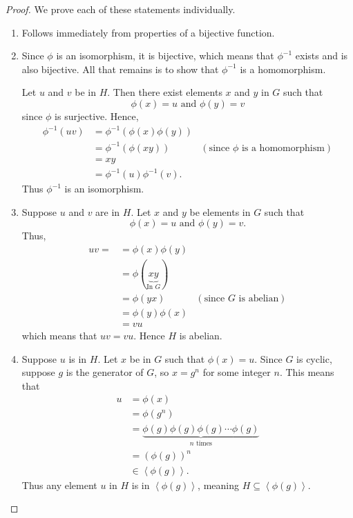 \begin{proof}
    We prove each of these statements individually.
    \begin{enumerate}
        \item Follows immediately from properties of a bijective function.

        \item Since $\phi$ is an isomorphism, it is bijective, which means that $\phi^{-1}$ exists and is also bijective. All that remains is to show that $\phi^{-1}$ is a homomorphism.

        Let $u$ and $v$ be in $H$. Then there exist elements $x$ and $y$ in $G$ such that
        \[
            \phi(x) = u \text{ and } \phi(y) = v
        \]
        since $\phi$ is surjective. Hence,
        \begin{align*}
            \phi^{-1}(uv) &= \phi^{-1}\left(\phi(x)\phi(y)\right)\\
            &= \phi^{-1}\left(\phi(xy)\right) & (\text{since } \phi \text{ is a homomorphism})\\
            &= xy\\
            &= \phi^{-1}(u) \phi^{-1}(v).
        \end{align*}
        Thus $\phi^{-1}$ is an isomorphism.

        \item Suppose $u$ and $v$ are in $H$. Let $x$ and $y$ be elements in $G$ such that
        \[
            \phi(x) = u \text{ and } \phi(y) = v.
        \]
        Thus,
        \begin{align*}
            uv = &= \phi(x)\phi(y) \\
            &= \phi(\underbrace{xy}_{\text{In } G})\\
            &= \phi(yx) & (\text{since } G \text{ is abelian})\\
            &= \phi(y)\phi(x)\\
            &= vu
        \end{align*}
        which means that $uv = vu$. Hence $H$ is abelian.

        \item Suppose $u$ is in $H$. Let $x$ be in $G$ such that $\phi(x) = u$. Since $G$ is cyclic, suppose $g$ is the generator of $G$, so $x = g^n$ for some integer $n$. This means that
        \begin{align*}
            u &= \phi(x)\\
            &= \phi(g^n)\\
            &= \underbrace{\phi(g)\phi(g)\phi(g)\cdots\phi(g)}_{n \text{ times}}\\
            &= \left(\phi(g)\right)^n\\
            &\in \left\langle \phi(g) \right\rangle.
        \end{align*}
        Thus any element $u$ in $H$ is in $\left\langle \phi(g) \right\rangle$, meaning $H \subseteq \left\langle \phi(g) \right\rangle$.


\end{enumerate}
\end{proof}
